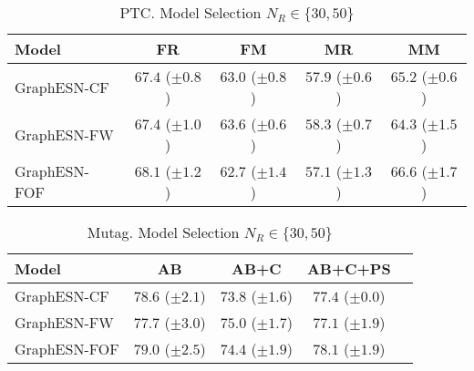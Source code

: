 \documentclass[10pt,a4paper]{book}
\begin{document}

\begin{table}[tbp]
\small
\caption{PTC. Model Selection $N_R \in \lbrace 30, 50 \rbrace $}
\label{}
\centering	
\begin{tabular}{l*{4}{c}}
\toprule
Model 		& FR				 & FM				  & MR				   & MM	\\
\midrule
GraphESN-CF  & $67.4$ ($\pm 0.8$) & $63.0$ ($\pm 0.8$) & $57.9$ ($\pm 0.6$) & $65.2$ ($\pm 0.6$) \\ 
GraphESN-FW  & $67.4$ ($\pm 1.0$) & $63.6$ ($\pm 0.6$) & $58.3$ ($\pm 0.7$) & $64.3$ ($\pm 1.5$) \\
GraphESN-FOF & $68.1$ ($\pm 1.2$) & $62.7$ ($\pm 1.4$) & $57.1$ ($\pm 1.3$) & $66.6$ ($\pm 1.7$) \\ 
\bottomrule
\end{tabular}
\end{table}



\begin{table}[tbp]
\small
\caption{Mutag. Model Selection $N_R \in \lbrace 30, 50 \rbrace $}
\label{}
\centering	
\begin{tabular}{l*{4}{c}}
\toprule
Model 		& AB				 & AB+C				  & AB+C+PS		\\
\midrule
GraphESN-CF  & $78.6$ ($\pm 2.1$) & $73.8$ ($\pm 1.6$) & $77.4$ ($\pm 0.0$)  \\ 
GraphESN-FW  & $77.7$ ($\pm 3.0$) & $75.0$ ($\pm 1.7$) & $77.1$ ($\pm 1.9$)  \\
GraphESN-FOF & $79.0$ ($\pm 2.5$) & $74.4$ ($\pm 1.9$) & $78.1$ ($\pm 1.9$)  \\ 
\bottomrule
\end{tabular}
\end{table}


\end{document}
